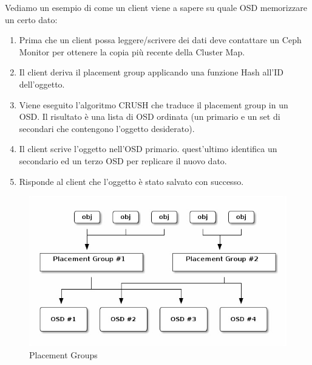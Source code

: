 \documentclass{article}
\begin{document}
Vediamo un esempio di come un client viene a sapere su quale OSD memorizzare un certo dato:
\begin{enumerate}
    \item Prima che un client possa leggere/scrivere dei dati deve contattare un Ceph Monitor per ottenere la copia più recente della Cluster Map.
    \item Il client deriva il placement group applicando una funzione Hash all'ID dell'oggetto.
    \item Viene eseguito l'algoritmo CRUSH che traduce il placement group in un OSD. Il risultato è una lista di OSD ordinata (un primario e un set di secondari che contengono l'oggetto desiderato).
    \item Il client scrive l'oggetto nell'OSD primario. quest'ultimo identifica un secondario ed un terzo OSD per replicare il nuovo dato.
    \item Risponde al client che l'oggetto è stato salvato con successo.
\end{enumerate}
\begin{figure}[H]
    \centering
    \includegraphics[scale=0.5]{img/pg.jpg}
    \caption{Placement Groups}
\end{figure}\noindent
\end{document}
